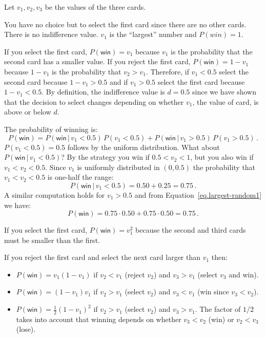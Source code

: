 Let $v_1,v_2,v_3$ be the values of the three cards.

 You have no choice but to select the first card since there are no other cards. There is no indifference value. $v_1$ is the ``largest'' number and $P({win})=1$.

 If you select the first card, $P(\textsf{win})=v_1$ because $v_1$ is the probability that the second card has a smaller value. If you reject the first card, $P(\textsf{win})=1-v_1$ because $1-v_1$ is the probability that $v_2>v_1$. Therefore, if $v_1<0.5$ select the second card because $1-v_1>0.5$ and if $v_1>0.5$ select the first card because $1-v_1<0.5$. By definition, the indifference value is $d=0.5$ since we have shown that the decision to select changes depending on whether $v_1$, the value of card, is above or below $d$.

The probability of winning is:
\begin{equation}\label{eq.largest-random1}
P(\textsf{win}) = P(\textsf{win} \,|\,v_1<0.5)\,P(v_1<0.5)+ P(\textsf{win}\,|\,v_1>0.5)\,P(v_1>0.5)\,.
\end{equation}
$P(v_1<0.5)=0.5$ follows by the uniform distribution. What about $P(\textsf{win} \,|\,v_1<0.5)$? By the strategy you win if $0.5<v_2<1$, but you also win if $v_1<v_2<0.5$. Since $v_1$ is uniformly distributed in $(0,0.5)$ the probability that $v_1<v_2<0.5$ is one-half the range:
\[
P(\textsf{win} \,|\,v_1<0.5)=0.50+0.25=0.75\,.
\]
A similar computation holds for $v_1>0.5$ and from Equation~\ref{eq.largest-random1} we have:
\[
P(\textsf{win})=0.75\cdot 0.50 + 0.75\cdot 0.50=0.75\,.
\]


If you select the first card, $P(\textsf{win})=v_1^2$ because the second and third cards must be smaller than the first.

If you reject the first card and select the next card larger than $v_1$ then:
\begin{itemize}
\item $P(\textsf{win})=v_1(1-v_1)$ if $v_2<v_1$ (reject $v_2$) and $v_3>v_1$ (select $v_3$ and win).
\item $P(\textsf{win})=(1-v_1)v_1$ if $v_2>v_1$ (select $v_2$) and $v_3<v_1$ (win since $v_3<v_2$).
\item $P(\textsf{win})=\frac{1}{2}(1-v_1)^2$ if $v_2>v_1$ (select $v_2$) and $v_3>v_1$. The factor of $1/2$ takes into account that winning depends on whether $v_3<v_2$ (win) or $v_2<v_3$ (lose).
\end{itemize}

